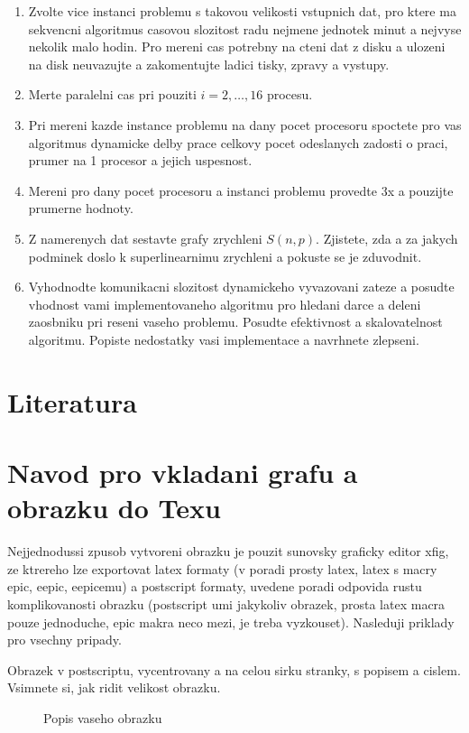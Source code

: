 \begin{enumerate}
\item Zvolte vice instanci problemu s takovou velikosti vstupnich dat, pro ktere ma sekvencni 
algoritmus casovou slozitost radu nejmene jednotek minut a nejvyse nekolik malo hodin.
Pro mereni cas potrebny na cteni dat z disku a ulozeni na disk neuvazujte a zakomentujte
ladici tisky, zpravy a vystupy.
\item Merte paralelni cas pri pouziti $i=2,\dots,16$ procesu.
\item Pri mereni kazde instance problemu na dany pocet procesoru spoctete pro vas
algoritmus dynamicke delby prace celkovy pocet odeslanych zadosti o praci,
prumer na 1 procesor a jejich uspesnost.
\item Mereni pro dany pocet procesoru a instanci problemu provedte 3x a pouzijte prumerne hodnoty.
\item Z namerenych dat sestavte grafy zrychleni $S(n,p)$. Zjistete, zda a za jakych podminek
doslo k superlinearnimu zrychleni a pokuste se je zduvodnit.
\item Vyhodnodte komunikacni slozitost dynamickeho vyvazovani zateze a posudte
vhodnost vami implementovaneho algoritmu pro hledani darce a deleni zaosbniku pri reseni vaseho
problemu. Posudte efektivnost a skalovatelnost algoritmu. Popiste nedostatky
vasi implementace a navrhnete zlepseni.
\end{enumerate}

\section{Literatura}

\appendix

\section{Navod pro vkladani grafu a obrazku do Texu}

Nejjednodussi zpusob vytvoreni obrazku je pouzit sunovsky graficky editor xfig,
ze ktrereho lze exportovat latex formaty (v poradi prosty latex, 
latex s macry epic, eepic, eepicemu) a postscript formaty,
uvedene poradi odpovida rustu komplikovanosti obrazku
(postscript umi jakykoliv obrazek, prosta latex macra pouze jednoduche,
epic makra neco mezi, je treba vyzkouset). Nasleduji priklady
pro vsechny pripady. 

Obrazek v postscriptu, vycentrovany a na celou sirku stranky, 
s popisem a cislem. Vsimnete si, jak ridit velikost obrazku.
\begin{figure}[ht]
\epsfysize=3cm
\centerline{}
\caption{Popis vaseho obrazku}
\label{labelvasehoobrazku}
\end{figure}

